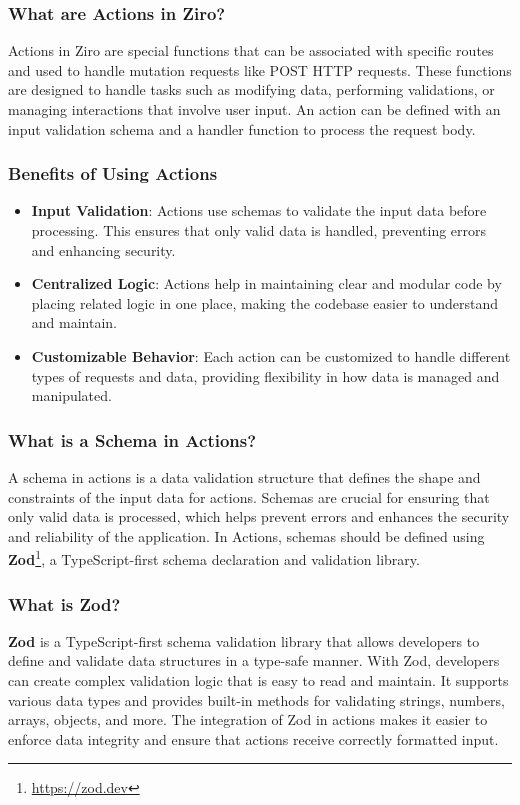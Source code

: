 \subsubsection*{What are Actions in Ziro?}
Actions in Ziro are special functions that can be associated with specific routes and used to handle mutation requests like POST HTTP requests. These functions are designed to handle tasks such as modifying data, performing validations, or managing interactions that involve user input. An action can be defined with an input validation schema and a handler function to process the request body.


\subsubsection*{Benefits of Using Actions}
\begin{itemize}
  \item \textbf{Input Validation}: Actions use schemas to validate the input data before processing. This ensures that only valid data is handled, preventing errors and enhancing security.

  \item \textbf{Centralized Logic}: Actions help in maintaining clear and modular code by placing related logic in one place, making the codebase easier to understand and maintain.

  \item \textbf{Customizable Behavior}: Each action can be customized to handle different types of requests and data, providing flexibility in how data is managed and manipulated.

\end{itemize}

\subsubsection*{What is a Schema in Actions?}
A schema in actions is a data validation structure that defines the shape and constraints of the input data for actions. Schemas are crucial for ensuring that only valid data is processed, which helps prevent errors and enhances the security and reliability of the application. In Actions, schemas should be defined using \textbf{Zod}\footnote{\url{https://zod.dev}}, a TypeScript-first schema declaration and validation library.

\subsubsection*{What is Zod?}
\textbf{Zod} is a TypeScript-first schema validation library that allows developers to define and validate data structures in a type-safe manner. With Zod, developers can create complex validation logic that is easy to read and maintain. It supports various data types and provides built-in methods for validating strings, numbers, arrays, objects, and more. The integration of Zod in actions makes it easier to enforce data integrity and ensure that actions receive correctly formatted input.

